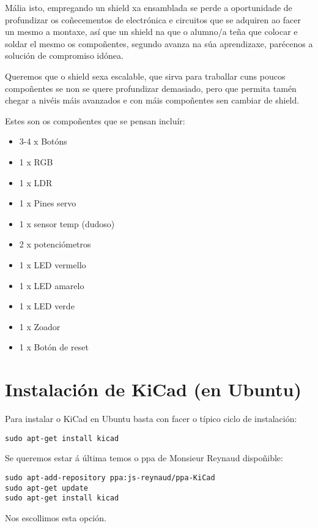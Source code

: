 Mália isto, empregando un shield xa ensamblada se perde a oportunidade
de profundizar os coñecementos de electrónica e circuitos que se
adquiren ao facer un mesmo a montaxe, así que un shield na que o
alumno/a teña que colocar e soldar el mesmo os compoñentes, segundo
avanza na súa aprendizaxe, parécenos a solución de compromiso idónea.

Queremos que o shield sexa escalable, que sirva para traballar cuns
poucos compoñentes se non se quere profundizar demasiado, pero que
permita tamén chegar a nivéis máis avanzados e con máis compoñentes sen
cambiar de shield.

Estes son os compoñentes que se pensan incluír:

\begin{itemize}
\itemsep1pt\parskip0pt
\item
  3-4 x Botóns
\item
  1 x RGB
\item
  1 x LDR
\item
  1 x Pines servo
\item
  1 x sensor temp (dudoso)
\item
  2 x potenciómetros
\item
  1 x LED vermello
\item
  1 x LED amarelo
\item
  1 x LED verde
\item
  1 x Zoador
\item
  1 x Botón de reset
\end{itemize}

\section{Instalación de KiCad (en
Ubuntu)}\label{instalaciuxf3n-de-kicad-en-ubuntu}

Para instalar o KiCad en Ubuntu basta con facer o típico ciclo de
instalación:

\begin{verbatim}
sudo apt-get install kicad
\end{verbatim}

Se queremos estar á última temos o ppa de Monsieur Reynaud dispoñible:

\begin{verbatim}
sudo apt-add-repository ppa:js-reynaud/ppa-KiCad
sudo apt-get update
sudo apt-get install kicad
\end{verbatim}

Nos escollimos esta opción.

